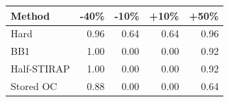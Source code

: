 \begin{tabular}{lrrrr}
\toprule
Method & -40\% & -10\% & +10\% & +50\% \\
\midrule
Hard & 0.96 & 0.64 & 0.64 & 0.96 \\
BB1 & 1.00 & 0.00 & 0.00 & 0.92 \\
Half-STIRAP & 1.00 & 0.00 & 0.00 & 0.92 \\
Stored OC & 0.88 & 0.00 & 0.00 & 0.64 \\
\bottomrule
\end{tabular}